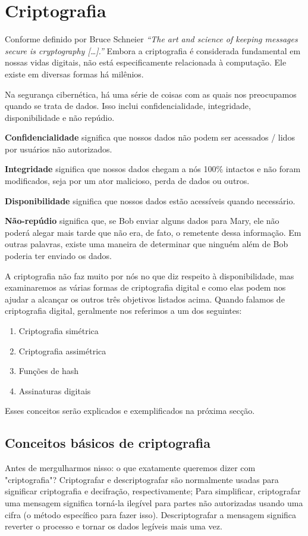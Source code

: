 \section{Criptografia}
Conforme definido por Bruce Schneier \textit{``The art and science of keeping messages secure is cryptography […].''} \cite{13} Embora a criptografia é considerada fundamental em nossas vidas digitais, não está especificamente relacionada à computação. Ele existe em diversas formas há milênios.

Na segurança cibernética, há uma série de coisas com as quais nos preocupamos quando se trata de dados. Isso inclui confidencialidade, integridade, disponibilidade e não repúdio.

\textbf{Confidencialidade} significa que nossos dados não podem ser acessados / lidos por usuários não autorizados.

\textbf{Integridade} significa que nossos dados chegam a nós 100\% intactos e não foram modificados, seja por um ator malicioso, perda de dados ou outros.

\textbf{Disponibilidade} significa que nossos dados estão acessíveis quando necessário.

\textbf{Não-repúdio} significa que, se Bob enviar alguns dados para Mary, ele não poderá alegar mais tarde que não era, de fato, o remetente dessa informação. Em outras palavras, existe uma maneira de determinar que ninguém além de Bob poderia ter enviado os dados.

A criptografia não faz muito por nós no que diz respeito à disponibilidade, mas examinaremos as várias formas de criptografia digital e como elas podem nos ajudar a alcançar os outros três objetivos listados acima. Quando falamos de criptografia digital, geralmente nos referimos a um dos seguintes:
\begin{enumerate}
  \item Criptografia simétrica
  \item Criptografia assimétrica
  \item Funções de hash
  \item Assinaturas digitais
\end{enumerate}

Esses conceitos serão explicados e exemplificados na próxima secção.
\subsection{Conceitos básicos de criptografia}
Antes de mergulharmos nisso: o que exatamente queremos dizer com "criptografia"? Criptografar e descriptografar são normalmente usadas para significar criptografia e decifração, respectivamente; Para simplificar, criptografar uma mensagem significa torná-la ilegível para partes não autorizadas usando uma cifra (o método específico para fazer isso). Descriptografar a mensagem significa reverter o processo e tornar os dados legíveis mais uma vez.

